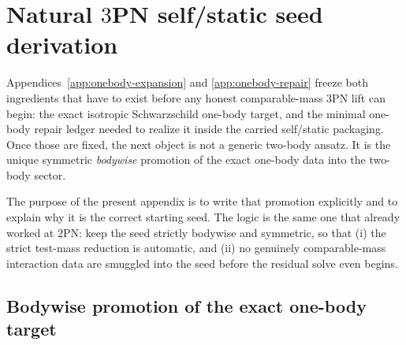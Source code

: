 \documentclass[11pt]{article}
\begin{document}

\section{Natural \texorpdfstring{$3$}{3}PN self/static seed derivation}
\label{app:self-static-seed}

Appendices~\ref{app:onebody-expansion} and \ref{app:onebody-repair} freeze
both ingredients that have to exist before any honest comparable-mass $3$PN lift
can begin: the exact isotropic Schwarzschild one-body target, and the minimal
one-body repair ledger needed to realize it inside the carried self/static
packaging.  Once those are fixed, the next object is not a generic two-body
ansatz.  It is the unique symmetric \emph{bodywise} promotion of the exact
one-body data into the two-body sector.

The purpose of the present appendix is to write that promotion explicitly and to
explain why it is the correct starting seed.  The logic is the same one that
already worked at $2$PN: keep the seed strictly bodywise and symmetric, so that
(i) the strict test-mass reduction is automatic, and (ii) no genuinely
comparable-mass interaction data are smuggled into the seed before the residual
solve even begins.

\subsection{Bodywise promotion of the exact one-body target}
\label{app:self-static-seed-bodywise}
\end{document}
